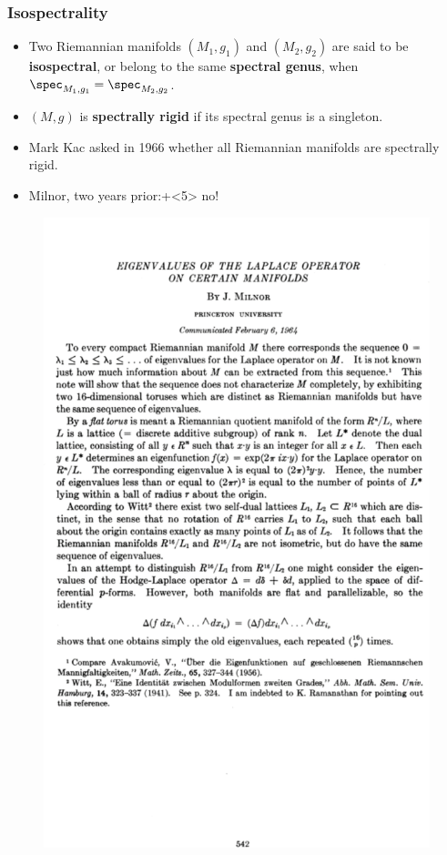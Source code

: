 \documentclass[10pt]{beamer}
\begin{document}
\begin{frame} \frametitle{Isospectrality}
			\begin{itemize}[<+->]
				\item  Two Riemannian manifolds $(M_1,g_1)$ and  $(M_2,g_2)$ are said to be \textbf{isospectral}, or belong to the same \textbf{spectral genus}, when $\spec_{M_1,g_1} = \spec_{M_2,g_2}$.
				\item $(M,g)$ is \textbf{spectrally rigid} if its spectral genus is a singleton. 
				\item Mark Kac asked in  1966 whether all Riemannian manifolds are spectrally rigid. 
				\item Milnor, two years prior:\onslide+<5> no! 
			\end{itemize}
\end{frame}
\begin{frame} %
	\begin{figure}
	\centering
	\includegraphics[scale=.3]{milnor}
\end{figure}
\end{frame}%
\end{document}

